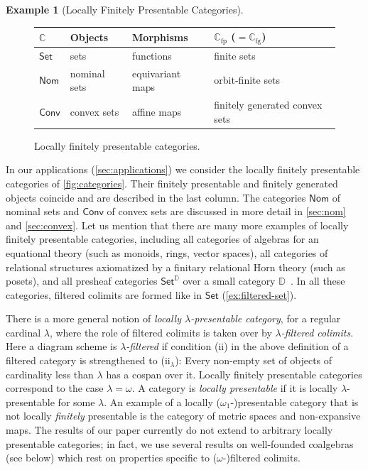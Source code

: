 \documentclass[10pt,a4paper]{article}
\theoremstyle{definition}
\newtheorem{example}[theorem]{Example}
\theoremstyle{remark}
\numberwithin{equation}{section}
\providecommand{\catname}{\mathsf}
\def\Set{\catname{Set}}
\def\Nom{\catname{Nom}}
\def\Conv{\catname{Conv}}
\newcommand{\lfplong}{locally finitely presentable\xspace}
\newcommand{\Lfplong}{Locally finitely presentable\xspace}
\newcommand{\lfp}{\lfplong}
\newcommand{\Lfp}{\Lfplong}
\providecommand{\C}{}
\providecommand{\D}{}
\newcommand{\fp}{{\mathrm{fp}}}
\newcommand{\fg}{{\mathrm{fg}}}
\renewcommand{\C}{{\mathbb{C}}}
\renewcommand{\D}{{\mathbb{D}}}
\theoremstyle{plain}
\theoremstyle{definition}
\begin{document}
\begin{example}[Locally Finitely Presentable Categories]\label{ex:categories} 
\begin{figure}[t]
\centering
\def\arraystretch{1.0}
\begin{tabular}{@{}p{1.5cm}p{2.5cm}p{3.2cm}p{5.5cm}@{}}
\toprule
$\C$ & Objects & Morphisms & $\C_\fp$ ($=\C_\fg$) \\
\midrule
$\Set$ & sets & functions & finite sets~ \\
$\Nom$ & nominal sets &  equivariant maps & orbit-finite sets \\
$\Conv$ & convex sets & affine maps & finitely generated convex sets \\
\bottomrule
\end{tabular}
\caption{\Lfplong categories.}\label{fig:categories}
\end{figure}
In our applications (\autoref{sec:applications}) we consider the \lfp categories of \autoref{fig:categories}. Their finitely presentable and finitely generated objects coincide and are described in the last column. The categories $\Nom$ of nominal sets and $\Conv$ of convex sets are discussed in more detail in \autoref{sec:nom} and \autoref{sec:convex}. Let us mention that there are many more examples of \lfp categories, including all categories of algebras for an equational theory (such as monoids, rings, vector spaces), all categories of relational structures axiomatized by a finitary relational Horn theory (such as posets), and all presheaf categories $\Set^\D$ over a small category $\D$~\cite{adamek_rosicky_1994}. In all these categories, filtered colimits are formed like in $\Set$ (\autoref{ex:filtered-set}).
\end{example}

\begin{rem}\label{rem:loc-pres}
There is a more general notion of \emph{locally $\lambda$-presentable category}, for a regular cardinal $\lambda$, where the role of filtered colimits is taken over by \emph{$\lambda$-filtered colimits}. Here a diagram scheme is \emph{$\lambda$-filtered} if condition (ii) in the above definition of a filtered category is strengthened to ($\text{ii}_\lambda$): Every non-empty set of objects of cardinality less than $\lambda$ has a cospan over it. \Lfp categories correspond to the case $\lambda=\omega$. A category is \emph{locally presentable} if it is locally $\lambda$-presentable for some $\lambda$. An example of a locally ($\omega_1$-)presentable category that is not locally \emph{finitely} presentable is the category of metric spaces and non-expansive maps. The results of our paper currently do not extend to arbitrary locally presentable categories; in fact, we use several results on well-founded coalgebras (see below) which rest on properties specific to ($\omega$-)filtered colimits.
\end{rem}
\end{document}
